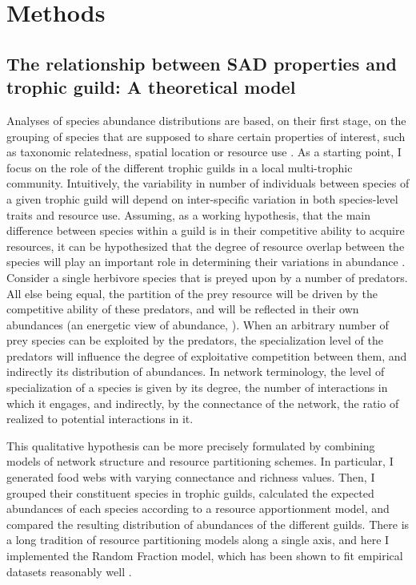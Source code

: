 \section{Methods}

\subsection*{The relationship between SAD properties and trophic guild: A theoretical model}

Analyses of species abundance distributions are based, on their first stage, on the grouping of species that are supposed to share certain properties of interest, such as taxonomic relatedness, spatial location or resource use \citep{Fauth1996}. As a starting point, I focus on the role of the different trophic guilds in a local multi-trophic community. Intuitively, the variability in number of individuals between species of a given trophic guild will depend on inter-specific variation in both species-level traits and resource use. Assuming, as a working hypothesis, that the main difference between species within a guild is in their competitive ability to acquire resources, it can be hypothesized that the degree of resource overlap between the species will play an important role in determining their variations in abundance \citep{Sugihara2003}. Consider a single herbivore species that is preyed upon by a number of predators. All else being equal, the partition of the prey resource will be driven by the competitive ability of these predators, and will be reflected in their own abundances (an energetic view of abundance, \citealt{Isaac2013}). When an arbitrary number of prey species can be exploited by the predators, the specialization level of the predators will influence the degree of exploitative competition between them, and indirectly its distribution of abundances. In network terminology, the level of specialization of a species is given by its degree, the number of interactions in which it engages, and indirectly, by the connectance of the network, the ratio of realized to potential interactions in it.

This qualitative hypothesis can be more precisely formulated by combining models of network structure and resource partitioning schemes. In particular, I generated food webs with varying connectance and richness values. Then, I grouped their constituent species in trophic guilds, calculated the expected abundances of each species according to a resource apportionment model, and compared the resulting distribution of abundances of the different guilds. There is a long tradition of resource partitioning models along a single axis, and here I implemented the Random Fraction model, which has been shown to fit empirical datasets reasonably well \citep{Tokeshi1990}.

